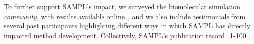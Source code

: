 \documentclass[11pt]{article}
\begin{document}
To further support SAMPL's impact, we surveyed the biomolecular simulation \emph{community}, with results available online~\cite{Mobley:2017:eScholarship}, and we also include testimonials from several past participants highlighting different ways in which SAMPL has directly impacted method development.
Collectively, SAMPL's publication record~[1-100],
\end{document}
